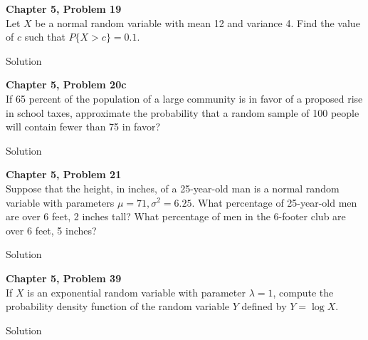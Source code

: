 \documentclass{article}
\begin{document}
\begin{spacing}{1.1}
\maketitle

\newpage
\begin{homeworkProblem}
  {\bf Chapter 5, Problem 19}\\
  Let $X$ be a normal random variable with mean 12 and variance 4. 
  Find the value of $c$ such that $P\{X > c\} = 0.1$.
  \begin{homeworkSection}{Solution}
    
  \end{homeworkSection}
\end{homeworkProblem}

\newpage
\begin{homeworkProblem}
  {\bf Chapter 5, Problem 20c}\\
  If 65 percent of the population of a large community is in favor of a 
  proposed rise in school taxes, approximate the probability that a random 
  sample of 100 people will contain fewer than 75 in favor?
  \begin{homeworkSection}{Solution}
    
  \end{homeworkSection}
\end{homeworkProblem}

\newpage
\begin{homeworkProblem}
  {\bf Chapter 5, Problem 21}\\
  Suppose that the height, in inches, of a 25-year-old man is a normal random 
  variable with parameters $\mu = 71, \sigma^2 = 6.25$.  
  What percentage of 25-year-old men are over 6 feet, 2 inches tall? 
  What percentage of men in the 6-footer club are over 6 feet, 5 inches?
  \begin{homeworkSection}{Solution}
    
  \end{homeworkSection}
\end{homeworkProblem}

\newpage
\begin{homeworkProblem}
  {\bf Chapter 5, Problem 39}\\
  If $X$ is an exponential random variable with parameter $\lambda = 1$,
  compute the probability density function of the random variable $Y$ 
  defined by $Y = \log X$.
  \begin{homeworkSection}{Solution}
    

\end{homeworkSection}
\end{homeworkProblem}
\end{spacing}
\end{document}
